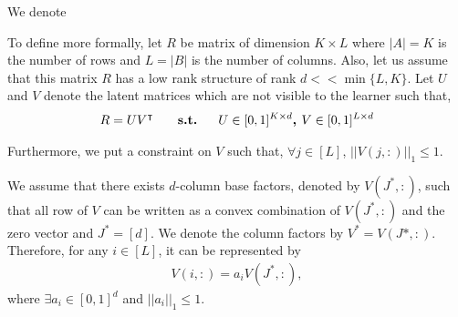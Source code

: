 	
	We denote 
	
	To define more formally, let $R$ be matrix of  dimension $K\times L$ where $|A|=K$ is the number of rows and $L=|B|$ is the number of columns. Also, let us assume that this matrix  $R$ has a low rank structure of rank $d << \min\lbrace L,K\rbrace$. Let $U$ and $V$ denote the latent matrices which are not visible to the learner such that,
\begin{align*}
	R = UV^{\intercal} \textbf{ \hspace*{4mm}   s.t.   \hspace*{4mm}} U\in [ 0,1 ]^{K\times d} \textbf{, } V\in  [0,1]^{L\times d} 
\end{align*}	  
	
	Furthermore, we put a constraint on $V$ such that, $\forall j\in [L]$, $ ||V(j,:)||_1 \leq 1$. 
	
	
%	

\begin{assumption}
\label{assm:1}
We assume that there exists $d$-column base factors, denoted by $V(J^*,:)$, such that all row of $V$ can be written as a convex combination of $V(J^*,:)$ and the zero vector and $J^* = [d]$. We denote the column factors by $V^* = V(J*,:)$. Therefore, for any $i\in [L]$, it can be represented by
\begin{align*}
V(i,:) = a_i V(J^*,:) , 
\end{align*}
where $\exists a_i\in [0,1]^{d}$ and $ ||a_i||_1 \leq 1$.
\end{assumption}